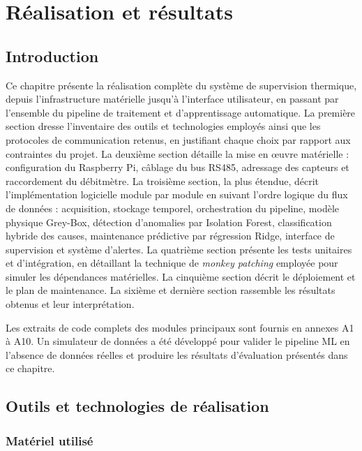 \chapter{Réalisation et résultats}
\newpage
\section*{Introduction}

Ce chapitre présente la réalisation complète du système de supervision thermique, depuis l'infrastructure matérielle jusqu'à l'interface utilisateur, en passant par l'ensemble du pipeline de traitement et d'apprentissage automatique. La première section dresse l'inventaire des outils et technologies employés ainsi que les protocoles de communication retenus, en justifiant chaque choix par rapport aux contraintes du projet. La deuxième section détaille la mise en œuvre matérielle : configuration du Raspberry Pi, câblage du bus RS485, adressage des capteurs et raccordement du débitmètre. La troisième section, la plus étendue, décrit l'implémentation logicielle module par module en suivant l'ordre logique du flux de données : acquisition, stockage temporel, orchestration du pipeline, modèle physique Grey-Box, détection d'anomalies par Isolation Forest, classification hybride des causes, maintenance prédictive par régression Ridge, interface de supervision et système d'alertes. La quatrième section présente les tests unitaires et d'intégration, en détaillant la technique de \textit{monkey patching} employée pour simuler les dépendances matérielles. La cinquième section décrit le déploiement et le plan de maintenance. La sixième et dernière section rassemble les résultats obtenus et leur interprétation.

Les extraits de code complets des modules principaux sont fournis en annexes A1 à A10. Un simulateur de données a été développé pour valider le pipeline ML en l'absence de données réelles et produire les résultats d'évaluation présentés dans ce chapitre.

\section{Outils et technologies de réalisation}

\subsection{Matériel utilisé}

